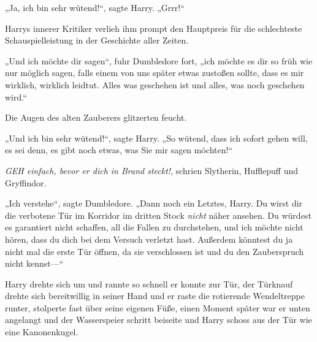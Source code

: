 „Ja, ich bin sehr wütend!“, sagte Harry. „Grrr!“

Harrys innerer Kritiker verlieh ihm prompt den Hauptpreis für die schlechteste Schauspielleistung in der Geschichte aller Zeiten.

„Und ich möchte dir sagen“, fuhr Dumbledore fort, „ich möchte es dir so früh wie nur möglich sagen, falls einem von uns später etwas zustoßen sollte, dass es mir wirklich, wirklich leidtut. Alles was geschehen ist und alles, was noch geschehen wird.“

Die Augen des alten Zauberers glitzerten feucht.

„Und ich bin sehr wütend!“, sagte Harry. „So wütend, dass ich sofort gehen will, es sei denn, es gibt noch etwas, was Sie mir sagen möchten!“

\emph{GEH einfach, bevor er dich in Brand steckt!}, schrien Slytherin, Hufflepuff und Gryffindor.

„Ich verstehe“, sagte Dumbledore. „Dann noch ein Letztes, Harry. Du wirst dir die verbotene Tür im Korridor im dritten Stock \emph{nicht} näher ansehen. Du würdest es garantiert nicht schaffen, all die Fallen zu durchstehen, und ich möchte nicht hören, dass du dich bei dem Versuch verletzt hast. Außerdem könntest du ja nicht mal die erste Tür öffnen, da sie verschlossen ist und du den Zauberspruch  nicht kennst—“

Harry drehte sich um und rannte so schnell er konnte zur Tür, der Türknauf drehte sich bereitwillig in seiner Hand und er raste die rotierende Wendeltreppe runter, stolperte fast über seine eigenen Füße, einen Moment später war er unten angelangt und der Wasserspeier schritt beiseite und Harry schoss aus der Tür wie eine Kanonenkugel.

